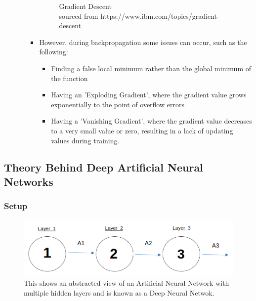 \documentclass[./project-report/src/latex/project-report.tex]{subfiles}
\begin{document}
\begin{itemize}
\begin{itemize}
\begin{itemize}
\begin{figure}[h!]
                \caption{Gradient Descent\\
                        sourced from https://www.ibm.com/topics/gradient-descent}
                \end{figure}
            \item However, during backpropagation some issues can occur, such as the following:
            \begin{itemize}
                \item Finding a false local minimum rather than the global minimum of the function
                \item Having an 'Exploding Gradient', where the gradient value grows exponentially to the point of overflow errors
                \item Having a 'Vanishing Gradient', where the gradient value decreases to a very small value or zero, resulting in a lack of updating values during 
                      training.
            \end{itemize}
        \end{itemize}
    \end{itemize}
\end{itemize}

\vspace{5mm}
\subsection{Theory Behind Deep Artificial Neural Networks}
\vspace{5mm}

\subsubsection{Setup}

\begin{figure}[h!]
\centering
\includegraphics[width=1\textwidth]{./project-report/src/images/deep-ann-diagram.png}
\caption{This shows an abstracted view of an Artificial Neural Network with multiple hidden layers and is known as a Deep Neural Netwok.}
\end{figure}
\end{document}
